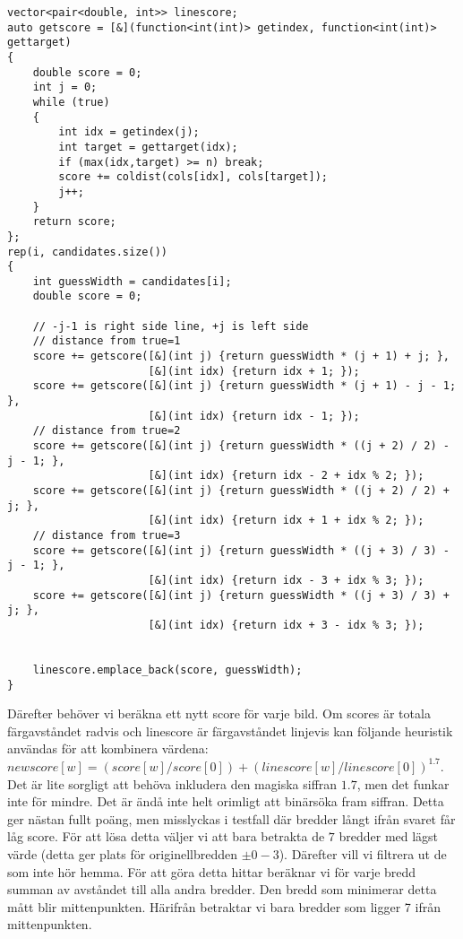 \documentclass{article}
\begin{document}
\begin{verbatim}
vector<pair<double, int>> linescore;
auto getscore = [&](function<int(int)> getindex, function<int(int)> gettarget)
{
    double score = 0;
    int j = 0;
    while (true)
    {
        int idx = getindex(j);
        int target = gettarget(idx);
        if (max(idx,target) >= n) break;
        score += coldist(cols[idx], cols[target]);
        j++;
    }
    return score;
};
rep(i, candidates.size())
{
    int guessWidth = candidates[i];
    double score = 0;

    // -j-1 is right side line, +j is left side
    // distance from true=1
    score += getscore([&](int j) {return guessWidth * (j + 1) + j; },
                      [&](int idx) {return idx + 1; });
    score += getscore([&](int j) {return guessWidth * (j + 1) - j - 1; },
                      [&](int idx) {return idx - 1; });
    // distance from true=2
    score += getscore([&](int j) {return guessWidth * ((j + 2) / 2) - j - 1; },
                      [&](int idx) {return idx - 2 + idx % 2; });
    score += getscore([&](int j) {return guessWidth * ((j + 2) / 2) + j; },
                      [&](int idx) {return idx + 1 + idx % 2; });
    // distance from true=3
    score += getscore([&](int j) {return guessWidth * ((j + 3) / 3) - j - 1; },
                      [&](int idx) {return idx - 3 + idx % 3; });
    score += getscore([&](int j) {return guessWidth * ((j + 3) / 3) + j; },
                      [&](int idx) {return idx + 3 - idx % 3; });
        
    
    linescore.emplace_back(score, guessWidth);
}
\end{verbatim}

Därefter behöver vi beräkna ett nytt score för varje bild. Om scores är totala färgavståndet radvis och linescore är färgavståndet linjevis kan följande heuristik användas för att kombinera värdena: $newscore[w] = (score[w]/score[0])+(linescore[w]/linescore[0])^{1.7}$. Det är lite sorgligt att behöva inkludera den magiska siffran $1.7$, men det funkar inte för mindre. Det är ändå inte helt orimligt att binärsöka fram siffran. Detta ger nästan fullt poäng, men misslyckas i testfall där bredder långt ifrån svaret får låg score. För att lösa detta väljer vi att bara betrakta de $7$ bredder med lägst värde (detta ger plats för originellbredden $\pm0-3$). Därefter vill vi filtrera ut de som inte hör hemma. För att göra detta hittar beräknar vi för varje bredd summan av avståndet till alla andra bredder. Den bredd som minimerar detta mått blir mittenpunkten. Härifrån betraktar vi bara bredder som ligger 7 ifrån mittenpunkten.
\end{document}
